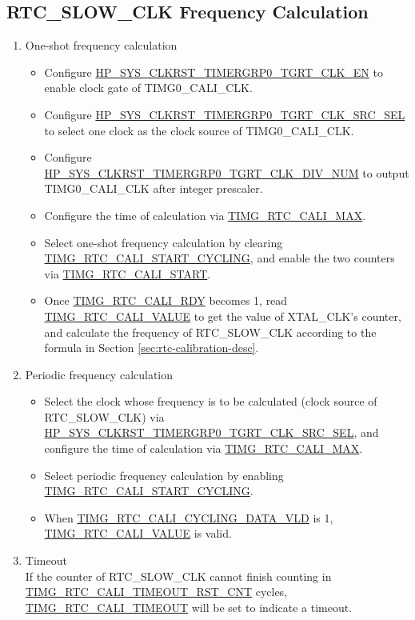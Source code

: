 \documentclass[main\_\_EN.tex]{subfiles}
\begin{document}
\subsection{RTC\_SLOW\_CLK Frequency Calculation}\label{sec:rtc-calibration-procedure}
\begin{enumerate}
    \item One-shot frequency calculation
    \begin{itemize}
        \item Configure \hyperref[fielddesc:HPSYSCLKRSTTIMERGRP0TGRTCLKEN]{HP\_SYS\_CLKRST\_TIMERGRP0\_TGRT\_CLK\_EN} to enable clock gate of TIMG0\_CALI\_CLK.
         \item Configure \hyperref[fielddesc:HPSYSCLKRSTTIMERGRP0TGRTCLKSRCSEL]{HP\_SYS\_CLKRST\_TIMERGRP0\_TGRT\_CLK\_SRC\_SEL} to select one clock as the clock source of TIMG0\_CALI\_CLK.
         \item Configure \hyperref[fielddesc:HPSYSCLKRSTTIMERGRP0TGRTCLKDIVNUM]{HP\_SYS\_CLKRST\_TIMERGRP0\_TGRT\_CLK\_DIV\_NUM} to output TIMG0\_CALI\_CLK after integer prescaler.
        \item Configure the time of calculation via \hyperref[fielddesc:TIMGRTCCALIMAX]{TIMG\_RTC\_CALI\_MAX}.
        \item Select one-shot frequency calculation by clearing \hyperref[fielddesc:TIMGRTCCALISTARTCYCLING]{TIMG\_RTC\_CALI\_START\_CYCLING}, and enable the two counters via \hyperref[fielddesc:TIMGRTCCALISTART]{TIMG\_RTC\_CALI\_START}.
        \item Once \hyperref[fielddesc:TIMGRTCCALIRDY]{TIMG\_RTC\_CALI\_RDY} becomes 1, read \hyperref[fielddesc:TIMGRTCCALIVALUE]{TIMG\_RTC\_CALI\_VALUE} to get the value of XTAL\_CLK's counter, and calculate the frequency of RTC\_SLOW\_CLK according to the formula in Section \ref{sec:rtc-calibration-desc}.
    \end{itemize}
    \item Periodic frequency calculation
    \begin{itemize}
        \item Select the clock whose frequency is to be calculated (clock source of RTC\_SLOW\_CLK) via \hyperref[fielddesc:HPSYSCLKRSTTIMERGRP0TGRTCLKSRCSEL]{HP\_SYS\_CLKRST\_TIMERGRP0\_TGRT\_CLK\_SRC\_SEL}, and configure the time of calculation via \hyperref[fielddesc:TIMGRTCCALIMAX]{TIMG\_RTC\_CALI\_MAX}.
        \item Select periodic frequency calculation by enabling \hyperref[fielddesc:TIMGRTCCALISTARTCYCLING]{TIMG\_RTC\_CALI\_START\_CYCLING}.
        \item When \hyperref[fielddesc:TIMGRTCCALICYCLINGDATAVLD]{TIMG\_RTC\_CALI\_CYCLING\_DATA\_VLD} is 1, \hyperref[fielddesc:TIMGRTCCALIVALUE]{TIMG\_RTC\_CALI\_VALUE} is valid.
    \end{itemize}
    \item Timeout\\
    If the counter of RTC\_SLOW\_CLK cannot finish counting in \hyperref[fielddesc:TIMGRTCCALITIMEOUTRSTCNT]{TIMG\_RTC\_CALI\_TIMEOUT\_RST\_CNT} cycles,  \\\hyperref[fielddesc:TIMGRTCCALITIMEOUT]{TIMG\_RTC\_CALI\_TIMEOUT} will be set to indicate a timeout.
\end{enumerate}
\end{document}
